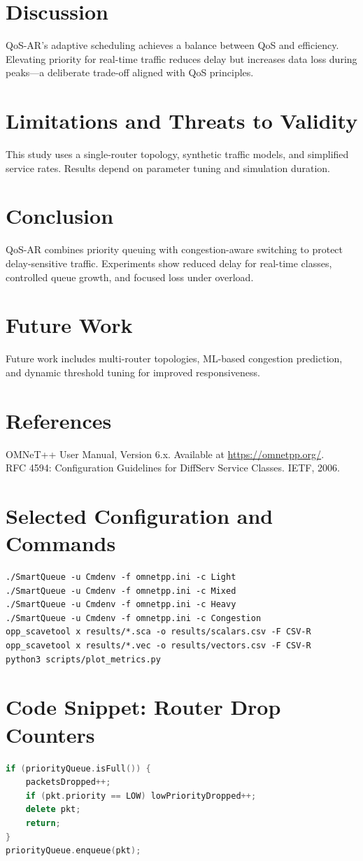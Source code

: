 \documentclass[12pt]{article}
\begin{document}
\section{Discussion}
QoS-AR's adaptive scheduling achieves a balance between QoS and efficiency. Elevating priority for real-time traffic reduces delay but increases data loss during peaks—a deliberate trade-off aligned with QoS principles.

\section{Limitations and Threats to Validity}
This study uses a single-router topology, synthetic traffic models, and simplified service rates. Results depend on parameter tuning and simulation duration.

\section{Conclusion}
QoS-AR combines priority queuing with congestion-aware switching to protect delay-sensitive traffic. Experiments show reduced delay for real-time classes, controlled queue growth, and focused loss under overload.

\section{Future Work}
Future work includes multi-router topologies, ML-based congestion prediction, and dynamic threshold tuning for improved responsiveness.

\clearpage
{}
\section*{References}
OMNeT++ User Manual, Version 6.x. Available at \url{https://omnetpp.org/}.\\
RFC 4594: Configuration Guidelines for DiffServ Service Classes. IETF, 2006.

\appendix
\clearpage
\section{Selected Configuration and Commands}
\begin{verbatim}
./SmartQueue -u Cmdenv -f omnetpp.ini -c Light
./SmartQueue -u Cmdenv -f omnetpp.ini -c Mixed
./SmartQueue -u Cmdenv -f omnetpp.ini -c Heavy
./SmartQueue -u Cmdenv -f omnetpp.ini -c Congestion
opp_scavetool x results/*.sca -o results/scalars.csv -F CSV-R
opp_scavetool x results/*.vec -o results/vectors.csv -F CSV-R
python3 scripts/plot_metrics.py
\end{verbatim}

\section{Code Snippet: Router Drop Counters}
\begin{lstlisting}[language=C++,caption={Illustrative drop counter update}]
if (priorityQueue.isFull()) {
    packetsDropped++;
    if (pkt.priority == LOW) lowPriorityDropped++;
    delete pkt;
    return;
}
priorityQueue.enqueue(pkt);
\end{lstlisting}
\end{document}
